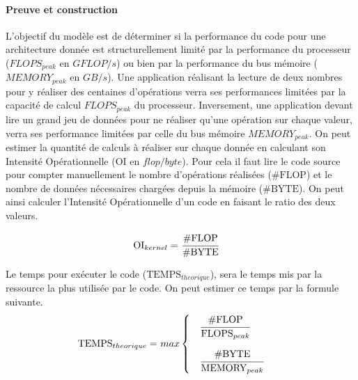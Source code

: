 \paragraph{Preuve et construction}
L’objectif du modèle est de déterminer si la performance du code pour une architecture donnée est structurellement limité par la performance du processeur ($FLOPS_{peak}$ en $GFLOP/s$) ou bien par la performance du bus mémoire ($MEMORY_{peak}$ en $GB/s$). Une application réalisant la lecture de deux nombres pour y réaliser des centaines d’opérations verra ses performances limitées par la capacité de calcul $FLOPS_{peak}$ du processeur. Inversement, une application devant lire un grand jeu de données pour ne réaliser qu'une opération sur chaque valeur, verra ses performance limitées par celle du bus mémoire $MEMORY_{peak}$. On peut estimer la quantité de calculs à réaliser sur chaque donnée en calculant son Intensité Opérationnelle  ($\text{OI}$ en $flop/byte$). Pour cela il faut lire le code source pour compter manuellement le nombre d’opérations réalisées ($\text{\#FLOP}$) et le nombre de données nécessaires chargées depuis la mémoire ($\text{\#BYTE}$). On peut ainsi calculer l’Intensité Opérationnelle d’un code en faisant le ratio des deux valeurs.

\begin{equation}
\begin{aligned}
        \text{OI}_{kernel} =\ &\cfrac{\text{\#FLOP}}{\text{\#BYTE}}
\end{aligned}
\end{equation}

Le temps pour exécuter le code ($\text{TEMPS}_{theorique}$), sera le temps mis par la ressource la plus utilisée par le code. On peut estimer ce temps par la formule suivante.
\begin{equation}
\begin{aligned}
     \text{TEMPS}_{theorique} =\  &max 
     \begin{cases} 
        \quad \cfrac{\text{\#FLOP}}{\text{FLOPS}_{peak}}    \\[15pt]
        \quad \cfrac{\text{\#BYTE}}{\text{MEMORY}_{peak}}
    \end{cases}
\end{aligned}
\end{equation}




